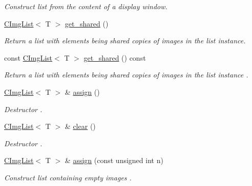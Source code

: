 \begin{DoxyCompactItemize}
\begin{DoxyCompactList}\small\item\em Construct list from the content of a display window. \end{DoxyCompactList}\item 
\hyperlink{structcimg__library__suffixed_1_1CImgList}{C\+Img\+List}$<$ T $>$ \hyperlink{structcimg__library__suffixed_1_1CImgList_a60bac5909029428b39ffc726b5f25079}{get\+\_\+shared} ()
\begin{DoxyCompactList}\small\item\em Return a list with elements being shared copies of images in the list instance. \end{DoxyCompactList}\item 
\mbox{\label{structcimg__library__suffixed_1_1CImgList_a07ee2014906efb3e7bc4797aa28e293b}} 
const \hyperlink{structcimg__library__suffixed_1_1CImgList}{C\+Img\+List}$<$ T $>$ \hyperlink{structcimg__library__suffixed_1_1CImgList_a07ee2014906efb3e7bc4797aa28e293b}{get\+\_\+shared} () const
\begin{DoxyCompactList}\small\item\em Return a list with elements being shared copies of images in the list instance . \end{DoxyCompactList}\item 
\hyperlink{structcimg__library__suffixed_1_1CImgList}{C\+Img\+List}$<$ T $>$ \& \hyperlink{structcimg__library__suffixed_1_1CImgList_a8fbb044c1ccfe53144c926308f02279e}{assign} ()
\begin{DoxyCompactList}\small\item\em Destructor . \end{DoxyCompactList}\item 
\hyperlink{structcimg__library__suffixed_1_1CImgList}{C\+Img\+List}$<$ T $>$ \& \hyperlink{structcimg__library__suffixed_1_1CImgList_a55a72d7cb35865a81afeb4ef8c57fa20}{clear} ()
\begin{DoxyCompactList}\small\item\em Destructor . \end{DoxyCompactList}\item 
\hyperlink{structcimg__library__suffixed_1_1CImgList}{C\+Img\+List}$<$ T $>$ \& \hyperlink{structcimg__library__suffixed_1_1CImgList_aecf17e0efeae347261b414e7d0216b78}{assign} (const unsigned int n)
\begin{DoxyCompactList}\small\item\em Construct list containing empty images . \end{DoxyCompactList}\item 

\end{DoxyCompactItemize}
